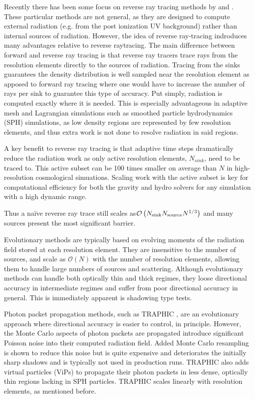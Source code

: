 \documentclass[fleq,usenatbib]{mnras}
\newcommand{\bigO}[1]{\mathcal{O}\left(#1\right)}
\newcommand{\NS}{N_{\rm source}}
\begin{document}
Recently there has been some focus on reverse ray tracing methods by
\cite{clarkEt12} and \cite{altayTheuns13}. These particular methods are not general, 
as they are designed to compute external radiation (e.g. from the post ionization UV 
background) rather than internal sources of radiation. However, the idea of 
reverse ray-tracing indroduces many advantages relative to reverse raytracing.
The main difference between forward and 
reverse ray tracing is that reverse ray tracers trace rays from the resolution 
elements directly to the sources of radiation. Tracing from the sinks 
guarantees the density distribution is well sampled near the resolution 
element as apposed to forward ray tracing where one would have to increase the 
number of rays per sink to guarantee this type of accuracy. Put simply, 
radiation is computed exactly where it is needed.  This is especially 
advantageous in adaptive mesh and Lagrangian simulations such as smoothed 
particle hydrodynamics (SPH) simulations, as low density regions are 
represented by few resolution elements, and thus extra work is not done to 
resolve radiation in said regions.

A key benefit to reverse ray tracing is that adaptive 
time steps dramatically reduce the radiation work as only active resolution elements, $N_{sink}$, need to be traced to.  This active subset can be 100 times smaller on average than $N$ in high-resolution cosmological simuations.  Scaling work with the active subset is key for computational efficiency for both the gravity and hydro solvers for any simulation with a high dynamic range.

Thus a na\"ive reverse ray trace 
still scales as$\bigO{N_{\rm sink} \NS N^{1/3}}$ and 
many sources present the most significant barrier.

Evolutionary methods are typically based on evolving moments of the radiation 
field stored at each resolution element. They are insensitive to the number 
of sources, and scale as $\mathcal{O}(N)$ with the number of resolution 
elements, allowing them to handle large numbers of sources and scattering. 
Although evolutionary methods can handle both optically thin and thick 
regimes, they loose directional accuracy in intermediate regimes and suffer 
from poor directional accuracy in general.  This is immediately apparent is shadowing type tests.

Photon packet propagation methods, such as TRAPHIC \citep{pawlikSchaye08}, are 
an evolutionary approach where directional accuracy is easier to control, in principle.
However, the Monte Carlo aspects of 
photon packets are propagated introduce significant Poisson noise 
into their computed radiation field.
Added Monte Carlo resampling is shown to reduce 
this noise but is quite expensive and deteriorates the initially sharp 
shadows and is typically not used in production runs.
TRAPHIC also adds virtual particles (ViPs) to propagate their photon packets 
in less dense, optically thin regions lacking in SPH particles. 
TRAPHIC scales linearly with resolution elements, as mentioned before.
\end{document}
